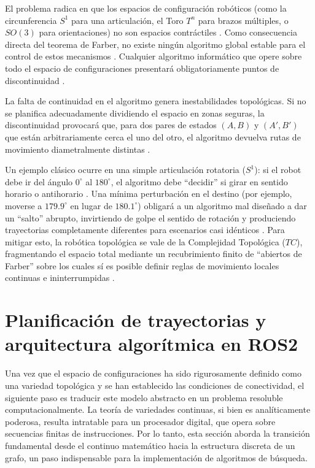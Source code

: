 El problema radica en que los espacios de configuración 
robóticos (como la circunferencia $S^1$ para una articulación, 
el Toro $T^n$ para brazos múltiples, o $SO(3)$ para orientaciones) 
no son espacios contráctiles \parencite{Mosquera2017}. Como consecuencia directa del teorema 
de Farber, no existe ningún algoritmo global estable para el control 
de estos mecanismos \parencite{Mosquera2017}. Cualquier algoritmo informático que opere sobre 
todo el espacio de configuraciones presentará obligatoriamente puntos 
de discontinuidad \parencite{farber2008}.

La falta de continuidad en el algoritmo genera inestabilidades topológicas. 
Si no se planifica adecuadamente dividiendo el 
espacio en zonas seguras, la discontinuidad provocará que, 
para dos pares de estados $(A, B)$ y $(A', B')$ que están 
arbitrariamente cerca el uno del otro, el algoritmo devuelva 
rutas de movimiento diametralmente distintas \parencite{Mosquera2017}. 

Un ejemplo clásico ocurre en una simple articulación rotatoria 
($S^1$): si el robot debe ir del ángulo 
$0^\circ$ al $180^\circ$, el algoritmo debe \enquote{decidir} si girar en 
sentido horario o antihorario \parencite{Mosquera2017}. Una mínima perturbación en el destino 
(por ejemplo, moverse a $179.9^\circ$ en lugar de $180.1^\circ$) 
obligará a un algoritmo mal diseñado a dar un \enquote{salto} abrupto, 
invirtiendo de golpe el sentido de rotación y produciendo 
trayectorias completamente diferentes para escenarios casi 
idénticos \parencite{Mosquera2017}. Para mitigar esto, la robótica topológica se vale de la 
Complejidad Topológica ($TC$), fragmentando el espacio total 
mediante un recubrimiento finito de \enquote{abiertos de Farber} sobre 
los cuales sí es posible definir reglas de movimiento locales 
continuas e ininterrumpidas \parencite{Mosquera2017}.

\section{Planificación de trayectorias y arquitectura algorítmica en ROS2}

Una vez que el espacio de configuraciones ha sido rigurosamente definido como una variedad topológica 
y se han establecido las condiciones de conectividad, el siguiente paso es traducir este modelo 
abstracto en un problema resoluble computacionalmente. La teoría de variedades continuas, si bien 
es analíticamente poderosa, resulta intratable para un procesador digital, que opera sobre secuencias 
finitas de instrucciones. Por lo tanto, esta sección aborda la transición fundamental desde el 
continuo matemático hacia la estructura discreta de un grafo, un paso indispensable para la 
implementación de algoritmos de búsqueda.

